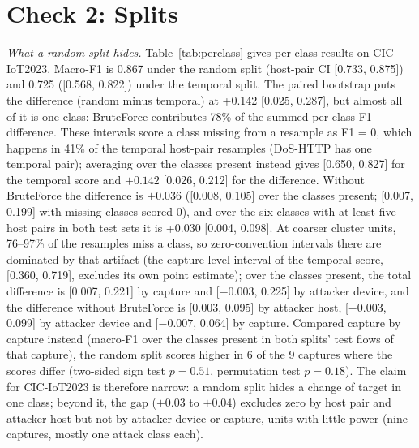 \section{Check 2: Splits}\label{sec:splits}

\emph{What a random split hides.} Table~\ref{tab:perclass} gives per-class results on CIC-IoT2023. Macro-F1 is 0.867 under the random split (host-pair CI [0.733, 0.875]) and 0.725 ([0.568, 0.822]) under the temporal split. The paired bootstrap puts the difference (random minus temporal) at +0.142 [0.025, 0.287], but almost all of it is one class: BruteForce contributes 78\% of the summed per-class F1 difference. These intervals score a class missing from a resample as F1 = 0, which happens in 41\% of the temporal host-pair resamples (DoS-HTTP has one temporal pair); averaging over the classes present instead gives [0.650, 0.827] for the temporal score and $+0.142$ [0.026, 0.212] for the difference. Without BruteForce the difference is $+0.036$ ([0.008, 0.105] over the classes present; [0.007, 0.199] with missing classes scored 0), and over the six classes with at least five host pairs in both test sets it is +0.030 [0.004, 0.098]. At coarser cluster units, 76--97\% of the resamples miss a class, so zero-convention intervals there are dominated by that artifact (the capture-level interval of the temporal score, [0.360, 0.719], excludes its own point estimate); over the classes present, the total difference is [0.007, 0.221] by capture and [$-0.003$, 0.225] by attacker device, and the difference without BruteForce is [0.003, 0.095] by attacker host, [$-0.003$, 0.099] by attacker device and [$-0.007$, 0.064] by capture. Compared capture by capture instead (macro-F1 over the classes present in both splits' test flows of that capture), the random split scores higher in 6 of the 9 captures where the scores differ (two-sided sign test $p=0.51$, permutation test $p=0.18$). The claim for CIC-IoT2023 is therefore narrow: a random split hides a change of target in one class; beyond it, the gap ($+0.03$ to $+0.04$) excludes zero by host pair and attacker host but not by attacker device or capture, units with little power (nine captures, mostly one attack class each).

